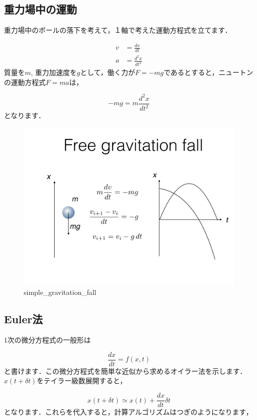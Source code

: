 \documentclass[11pt,dvipdfmx]{jsarticle}
\makeatletter
\def\maxwidth{\ifdim\Gin@nat@width>\linewidth\linewidth
    \else\Gin@nat@width\fi}
\let\Oldincludegraphics\includegraphics
\renewcommand{\includegraphics}[1]{\Oldincludegraphics[width=.8\maxwidth]{#1}}
\makeatother
\begin{document}
\subsection{重力場中の運動}\label{ux91cdux529bux5834ux4e2dux306eux904bux52d5}

重力場中のボールの落下を考えて，１軸で考えた運動方程式を立てます．

\[
\begin{aligned}
v &= \frac{dx}{dt} \\
a &= \frac{d^2 x}{dt^2}
\end{aligned}
\] 質量を\(m\),
重力加速度を\(g\)として，働く力が\(F=-mg\)であるとすると，ニュートンの運動方程式\(F=ma\)は，

\[ 
-mg = m \frac{d^2 x}{dt^2}
\] となります．

\begin{figure}[htbp]
\centering
\includegraphics{../figs/ode.002.jpeg}
\caption{simple\_gravitation\_fall}
\end{figure}

    \subsection{Euler法}\label{eulerux6cd5}

1次の微分方程式の一般形は

\[
\frac{dx}{dt}=f(x,t)
\]
と書けます．この微分方程式を簡単な近似から求めるオイラー法を示します．
\(x(t+\delta t)\)をテイラー級数展開すると，

\[
x(t+\delta t) \simeq x(t) + \frac{dx}{dt} \delta t
\]
となります．これらを代入すると，計算アルゴリズムはつぎのようになります，
\end{document}
